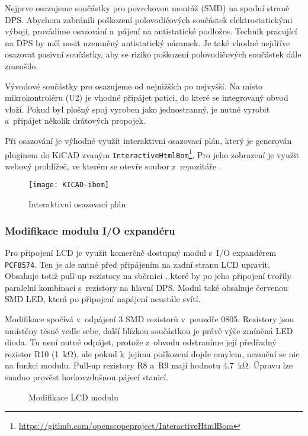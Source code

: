 Nejprve osazujeme součástky pro povrchovou montáž (\acs{SMD}) na spodní straně
DPS. Abychom zabránili poškození polovodičových součástek elektrostatickými
výboji, provádíme osazování a~pájení na antistatické podložce. Technik
pracující na DPS by měl nosit uzemněný antistatický náramek. Je také vhodné
nejdříve osazovat pasivní součástky, aby se riziko poškození polovodičových
součástek dále zmenšilo.

Vývodové součástky pro osazujeme od nejnižších po nejvyšší. Na místo
mikrokontroléru (U2) je vhodné připájet patici, do které se integrovaný obvod
vloží. Pokud byl plošný spoj vyroben jako jednostranný, je nutné vyrobit
a~připájet několik drátových propojek.

Při osazování je výhodné využít interaktivní osazovací plán, který je generován
pluginem do KiCAD zvaným
\texttt{InteractiveHtmlBom}\footnote{\url{https://github.com/openscopeproject/InteractiveHtmlBom}}.
Pro jeho zobrazení je využit webový prohlížeč, ve kterém se otevře soubor
 z~repozitáře .

\begin{figure}[htbp]
    \centering
    \texttt{[image: KICAD-ibom]}
    \caption{Interaktivní osazovací plán}
    \label{fig:PCB ibom}
\end{figure}


\subsubsection{Modifikace modulu I/O expandéru}
Pro připojení LCD je využit komerčně dostupný modul s~I/O expandérem
\texttt{PCF8574}. Ten je ale nutné před připájením na zadní stranu LCD upravit.
Obsahuje totiž pull-up rezistory na sběrnici \IIC{}, které by po jeho připojení
tvořily paralelní kombinaci s~rezistory na hlavní DPS. Modul také obsahuje
červenou SMD LED, která po připojení napájení neustále svítí.

Modifikace spočívá v~odpájení 3 SMD rezistorů v~pouzdře 0805. Rezistory jsou
umístěny těsně vedle sebe, další blízkou součástkou je právě výše zmíněná LED
dioda. Tu není nutné odpájet, protože z~obvodu odstraníme její předřadný
rezistor R10 (\SI{1}{\kilo\ohm}), ale pokud k~jejímu poškození dojde omylem,
nezmění se nic na funkci modulu. Pull-up rezistory R8 a~R9 mají hodnotu
\SI{4,7}{\kilo\ohm}. Úpravu lze snadno provést horkovzdušnou pájecí stanicí.

\begin{figure}[htbp]
    \centering
    \caption{Modifikace LCD modulu}
    \label{fig:PCB LCD modul modifikace}
\end{figure}


